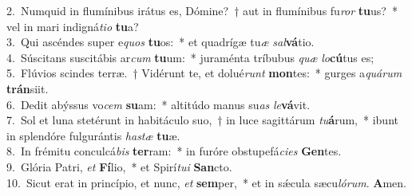 {2.~}Numquid in flumínibus irátus es, Dómine?~† aut in flumínibus fu\textit{ror} \textbf{tu}us?~* vel in mari indigná\textit{ti}\textit{o} \textbf{tu}a?\\
{3.~}Qui ascéndes super e\textit{quos} \textbf{tu}os:~* et quadrígæ tu\textit{æ} \textit{sal}\textbf{vá}tio.\\
{4.~}Súscitans suscitábis ar\textit{cum} \textbf{tu}um:~* juraménta tríbubus \textit{quæ} \textit{lo}\textbf{cú}tus es;\\
{5.~}Flúvios scindes terræ.~† Vidérunt te, et dolué\textit{runt} \textbf{mon}tes:~* gurges a\textit{quá}\textit{rum} \textbf{trán}siit.\\
{6.~}Dedit abýssus vo\textit{cem} \textbf{su}am:~* altitúdo manus su\textit{as} \textit{le}\textbf{vá}vit.\\
{7.~}Sol et luna stetérunt in habitáculo suo,~† in luce sagittárum \textit{tu}\textbf{á}rum,~* ibunt in splendóre fulgurántis \textit{ha}\textit{stæ} \textbf{tu}æ.\\
{8.~}In frémitu conculcá\textit{bis} \textbf{ter}ram:~* in furóre obstupefá\textit{ci}\textit{es} \textbf{Gen}tes.\\
{9.~}Glória Patri, \textit{et} \textbf{Fí}lio,~* et Spirí\textit{tu}\textit{i} \textbf{San}cto.\\
{10.~}Sicut erat in princípio, et nunc, \textit{et} \textbf{sem}per,~* et in sǽcula sæcu\textit{ló}\textit{rum}. \textbf{A}men.\\
